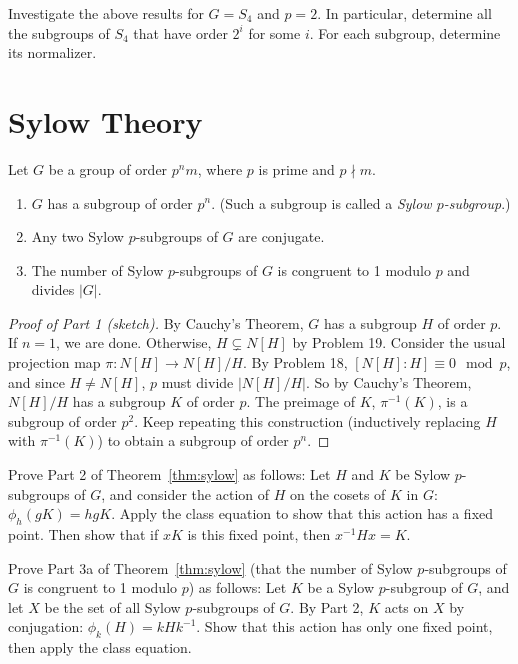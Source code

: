 \begin{problem}
Investigate the above results for $G = S_4$ and $p = 2$.  In particular, determine all the subgroups of $S_4$ that have order $2^i$ for some $i$.  For each subgroup, determine its normalizer.
\end{problem}


\section{Sylow Theory}

\begin{theorem}\label{thm:sylow}
 Let $G$ be a group of order $p^nm$, where $p$ is prime and $p \nmid m$.
 \begin{enumerate}
  \item $G$ has a subgroup of order $p^n$. (Such a subgroup is called a \emph{Sylow $p$-subgroup}.)
  \item Any two Sylow $p$-subgroups of $G$ are conjugate.
  \item The number of Sylow $p$-subgroups of $G$ is congruent to 1 modulo $p$ and divides $\lvert G \rvert$.
 \end{enumerate}
\end{theorem}

\begin{proof}[Proof of Part 1 (sketch)]
 By Cauchy's Theorem, $G$ has a subgroup $H$ of order $p$. If $n=1$, we are done. Otherwise, $H \subsetneq N[H]$ by Problem 19. Consider the usual projection map $\pi:N[H]\longrightarrow N[H]/H$. By Problem 18, $[N[H]:H] \equiv 0 \mod p$, and since $H \neq N[H]$, $p$ must divide $\lvert N[H]/H \rvert$. So by Cauchy's Theorem, $N[H]/H$ has a subgroup $K$ of order $p$. The preimage of $K$, $\pi^{-1}(K)$, is a subgroup of order $p^2$. Keep repeating this construction (inductively replacing $H$ with $\pi^{-1}(K)$) to obtain a subgroup of order $p^n$.
\end{proof}

\begin{problem}
Prove Part 2 of Theorem~\ref{thm:sylow} as follows: Let $H$ and $K$ be Sylow $p$-subgroups of $G$, and consider the action of $H$ on the cosets of $K$ in $G$: $\phi_h(gK)=hgK$. Apply the class equation to show that this action has a fixed point. Then show that if $xK$ is this fixed point, then $x^{-1}Hx=K$.
\end{problem}



\begin{problem}
Prove Part 3a of Theorem~\ref{thm:sylow} (that the number of Sylow $p$-subgroups of $G$ is congruent to 1 modulo $p$) as follows: Let $K$ be a Sylow $p$-subgroup of $G$, and let $X$ be the set of all Sylow $p$-subgroups of $G$. By Part 2, $K$ acts on $X$ by conjugation: $\phi_k(H) = kHk^{-1}$. Show that this action has only one fixed point, then apply the class equation.
\end{problem}



